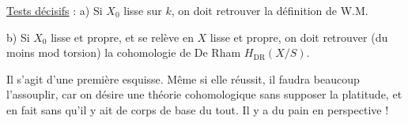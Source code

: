 \uline{Tests décisifs} : a) Si $X_0$ lisse  sur $k$, on doit retrouver la définition de W.M.

b) Si $X_0$ lisse et propre, et se relève en $X$ lisse et propre, on doit retrouver (du moins mod torsion) la cohomologie de De Rham $H_{\mathrm{DR}}(X/S)$.

Il s'agit d'une première  esquisse. Même si elle réussit, il faudra beaucoup l'assouplir, car on désire une théorie cohomologique sans supposer la platitude, et en fait sans qu'il y ait de corps de base du tout. Il y a du pain en perspective !
